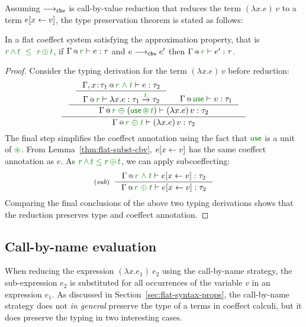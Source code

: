 Assuming $\longrightarrow_{\textnormal{\sffamily cbv}}$ is call-by-value reduction that reduces the term
$(\lambda x.e)\,v$ to a term $e[x \leftarrow v]$, the type preservation theorem is
stated as follows:

\begin{theorem}
\label{thm:cbv-reduction}
In a flat coeffect system satisfying the approximation property, that is
$\cclrd{r}\,\czip\,\cclrd{t}~\;\cleq~\;\cclrd{r}\,\cpar\,\cclrd{t}$,
if $\coctx{\Gamma}{\cclrd{r}} \vdash e : \tau$
and $e \longrightarrow_{\textnormal{\sffamily cbv}} e'$ then $\coctx{\Gamma}{\cclrd{r}} \vdash e' : \tau$.
\end{theorem}
\begin{proof}
Consider the typing derivation for the term $(\lambda x.e)\,v$ before reduction:
\begin{equation*}
\inference
  { \inference
  { \inference
      {\coctx{\Gamma, x\!:\!\tau_1}{\cclrd{r}\;\czip\;\cclrd{t}} \vdash e : \tau_2}
      {\coctx{\Gamma}{\cclrd{r}} \vdash \lambda x.e : \tau_1 \xrightarrow{\cclrd{t}} \tau_2 } &
   \coctx{\Gamma}{\cunit} \vdash v : \tau_1 }
  {\coctx{\Gamma}{\cclrd{r} \;\cpar\; (\cunit \,\cseq\, \cclrd{t})} \vdash (\lambda x.e)\,v : \tau_2} }
  {\coctx{\Gamma}{\cclrd{r} \;\cpar\; \cclrd{t}} \vdash (\lambda x.e)\,v : \tau_2}
\end{equation*}
The final step simplifies the coeffect annotation using the fact that $\cunit$ is a unit of $\cseq$.
From Lemma~\ref{thm:flat-subst-cbv}, $e[x \leftarrow v]$ has the same coeffect annotation as $e$.
As $\cclrd{r}\,\czip\,\cclrd{t}\;\cleq\;\cclrd{r}\,\cpar\,\cclrd{t}$, we can apply subcoeffecting:
%
\begin{equation*}
\tyrule{sub}
 { \coctx{\Gamma}{\cclrd{r}\;\czip\;\cclrd{t}} \vdash \subst{e}{x}{v} : \tau_2 }
 { \coctx{\Gamma}{\cclrd{r}\;\cpar\;\cclrd{t}} \vdash \subst{e}{x}{v} : \tau_2 }
\end{equation*}
%
Comparing the final conclusions of the above two typing derivations shows that
the reduction preserves type and coeffect annotation.
\end{proof}


\subsection{Call-by-name evaluation}
\label{sec:flat-syntax-cbn}

When reducing the expression $(\lambda x.e_1)~e_2$ using the call-by-name strategy, the
sub-expression $e_2$ is substituted for all occurrences of the variable $v$ in an expression $e_1$.
As discussed in Section~\ref{sec:flat-syntax-props}, the call-by-name strategy does not \emph{in
general} preserve the type of a terms in coeffect calculi, but it does preserve the typing in two
interesting cases.

